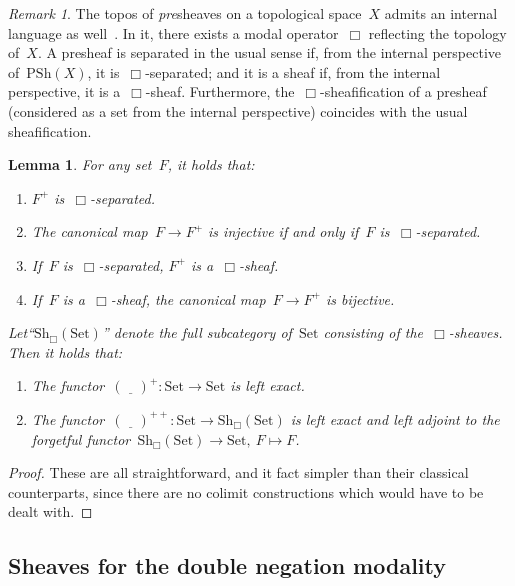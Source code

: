 \documentclass[10pt]{amsart}
\theoremstyle{definition}
\theoremstyle{plain}
\newtheorem{lemma}[defn]{Lemma}
\theoremstyle{remark}
\newtheorem{rem}[defn]{Remark}
\newcommand{\placeholder}{\underline{\quad}}
\newcommand{\Set}{\mathrm{Set}}
\newcommand{\Sh}{\mathrm{Sh}}
\newcommand{\PSh}{\mathrm{PSh}}
\newcommand{\?}{\,{:}\,}
\renewcommand{\_}{\mathpunct{.}\,}
\begin{document}
\begin{rem}The topos of \emph{pre}sheaves on a topological space~$X$ admits an
internal language as well~\cite[???]{moerdijk-maclane:sheaves-logic}. In it, there
exists a modal operator~$\Box$ reflecting the topology of~$X$. A presheaf is separated
in the usual sense if, from the internal perspective of~$\PSh(X)$, it
is~$\Box$-separated; and it is a sheaf if, from the internal perspective, it
is a~$\Box$-sheaf. Furthermore, the~$\Box$-sheafification of a presheaf
(considered as a set from the internal perspective) coincides with the usual
sheafification.\end{rem}

\begin{lemma}For any set~$F$, it holds that: \begin{enumerate}
\item $F^+$ is~$\Box$-separated.
\item The canonical map~$F \to F^+$ is injective if and only if~$F$
is~$\Box$-separated.
\item If~$F$ is~$\Box$-separated, $F^+$ is a~$\Box$-sheaf.
\item If~$F$ is a~$\Box$-sheaf, the canonical map~$F \to F^+$ is bijective.
\end{enumerate}
Let``$\Sh_\Box(\Set)$'' denote the full subcategory of~$\Set$ consisting of
the~$\Box$-sheaves. Then it holds that:
\begin{enumerate}
\addtocounter{enumi}{4}
\item The functor~$(\placeholder)^+ : \Set \to \Set$ is left exact.
\item The functor~$(\placeholder)^{++} : \Set \to \Sh_\Box(\Set)$ is left exact and left
adjoint to the forgetful functor~$\Sh_\Box(\Set) \to \Set,\ F \mapsto F$.
\end{enumerate}\end{lemma}
\begin{proof}These are all straightforward, and it fact simpler than their
classical counterparts, since there are no colimit constructions which would have to
be dealt with.
\end{proof}


\subsection{Sheaves for the double negation modality}
\end{document}
